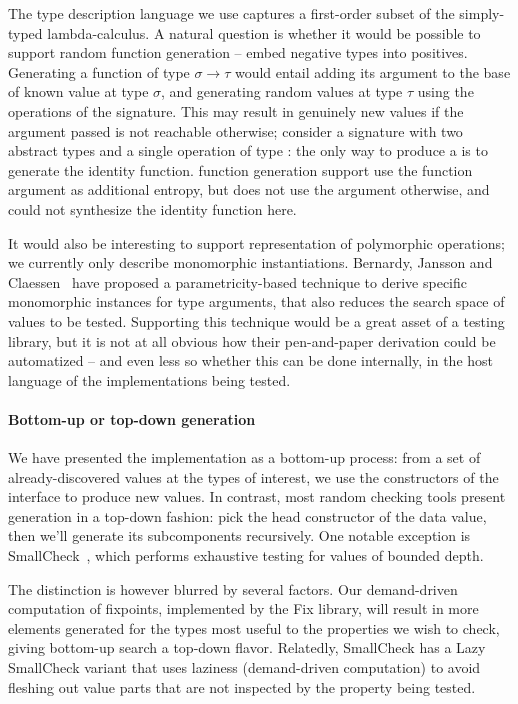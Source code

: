 The type description language we use captures a first-order subset of
the simply-typed lambda-calculus. A natural question is whether it
would be possible to support random function generation -- embed
negative types into positives. Generating a function of type $\sigma
\to \tau$ would entail adding its argument to the base of known value
at type $\sigma$, and generating random values at type $\tau$ using
the operations of the signature. This may result in genuinely new
values if the argument passed is not reachable otherwise; consider
a signature with two abstract types  and a single operation
of type : the only way to produce a  is to
generate the identity function. \qcheck function generation support
use the function argument as additional entropy, but does not use the
argument otherwise, and could not synthesize the identity function here.

It would also be interesting to support representation of polymorphic
operations; we currently only describe monomorphic
instantiations. Bernardy, Jansson and
Claessen~\cite{testing-polymorphic-properties} have proposed
a parametricity-based technique to derive specific monomorphic
instances for type arguments, that also reduces the search space of
values to be tested. Supporting this technique would be a great asset
of a testing library, but it is not at all obvious how their
pen-and-paper derivation could be automatized -- and even less so
whether this can be done internally, in the host language of the
implementations being tested.

\paragraph{Bottom-up or top-down generation}

We have presented the  implementation as a bottom-up
process: from a set of already-discovered values at the types of
interest, we use the constructors of the interface to produce new
values. In contrast, most random checking tools present generation in
a top-down fashion: pick the head constructor of the data value, then
we'll generate its subcomponents recursively. One notable exception is
SmallCheck~\cite{smallcheck}, which performs exhaustive testing for
values of bounded depth.

The distinction is however blurred by several factors. Our
demand-driven computation of fixpoints, implemented by the Fix
library, will result in more elements generated for the types most
useful to the properties we wish to check, giving bottom-up search
a top-down flavor. Relatedly, SmallCheck has a Lazy SmallCheck variant
that uses laziness (demand-driven computation) to avoid fleshing out
value parts that are not inspected by the property being tested.

